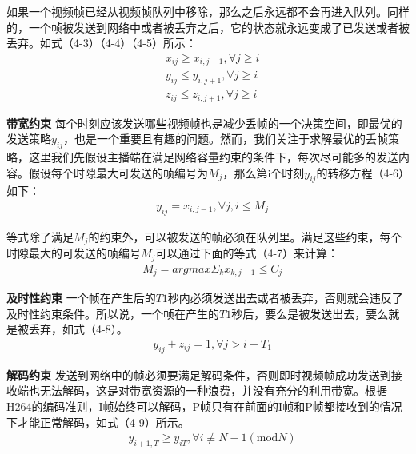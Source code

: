 如果一个视频帧已经从视频帧队列中移除，那么之后永远都不会再进入队列。同样的，一个帧被发送到网络中或者被丢弃之后，它的状态就永远变成了已发送或者被丢弃。如式（4-3）（4-4）（4-5）所示：
\begin{align}
  & x_{ij} \geq x_{i,j+1}, \forall j\geq i \\
  & y_{ij} \leq y_{i,j+1}, \forall j\geq i \\
  & z_{ij} \leq z_{i,j+1}, \forall j\geq i
\end{align}

\textbf{带宽约束} 每个时刻应该发送哪些视频帧也是减少丢帧的一个决策空间，即最优的发送策略$y_{ij}$，也是一个重要且有趣的问题。然而，我们关注于求解最优的丢帧策略，这里我们先假设主播端在满足网络容量约束的条件下，每次尽可能多的发送内容。假设每个时隙最大可发送的帧编号为$M_j$，那么第i个时刻$y_{ij}$的转移方程（4-6）如下：
\begin{align}
  &   y_{ij} = x_{i,j-1}, \forall j, i \leq M_{j}
\end{align}

等式除了满足$M_j$的约束外，可以被发送的帧必须在队列里。满足这些约束，每个时隙最大的可发送的帧编号$M_j$可以通过下面的等式（4-7）来计算：
\begin{align}
 & M_j = argmax \Sigma_k x_{k,j-1} \leq C_{j}
\end{align}

\textbf{及时性约束} 一个帧在产生后的$T1$秒内必须发送出去或者被丢弃，否则就会违反了及时性约束条件。所以说，一个帧在产生的$T1$秒后，要么是被发送出去，要么就是被丢弃，如式（4-8）。
\begin{align}
  & y_{ij}+z_{ij} = 1 ,\forall j>i+T_1
\end{align}

\textbf{解码约束} 发送到网络中的帧必须要满足解码条件，否则即时视频帧成功发送到接收端也无法解码，这是对带宽资源的一种浪费，并没有充分的利用带宽。根据H264的编码准则，I帧始终可以解码，P帧只有在前面的I帧和P帧都接收到的情况下才能正常解码，如式（4-9）所示。
\begin{align}
  & y_{i+1,T} \geq y_{iT}, \forall i \not\equiv N-1 (\text{mod}N)
\end{align}

